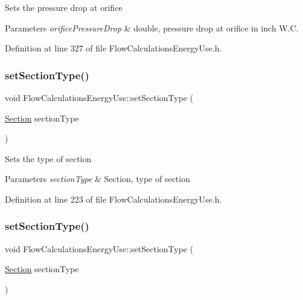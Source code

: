 Sets the pressure drop at orifice


\begin{DoxyParams}{Parameters}
{\em orifice\+Pressure\+Drop} & double, pressure drop at orifice in inch W.\+C. \\
\hline
\end{DoxyParams}


Definition at line 327 of file Flow\+Calculations\+Energy\+Use.\+h.

\mbox{\label{class_flow_calculations_energy_use_add93257048914dbd920b6dc2be431b69}} 
\subsubsection{\texorpdfstring{set\+Section\+Type()}{setSectionType()}\hspace{0.1cm}{\footnotesize\ttfamily [1/3]}}
{\footnotesize\ttfamily void Flow\+Calculations\+Energy\+Use\+::set\+Section\+Type (\begin{DoxyParamCaption}\item[{\hyperlink{class_flow_calculations_energy_use_afbabab0da698748de91369a5dfc7662a}{Section}}]{section\+Type }\end{DoxyParamCaption})\hspace{0.3cm}{\ttfamily [inline]}}

Sets the type of section


\begin{DoxyParams}{Parameters}
{\em section\+Type} & Section, type of section \\
\hline
\end{DoxyParams}


Definition at line 223 of file Flow\+Calculations\+Energy\+Use.\+h.

\mbox{\label{class_flow_calculations_energy_use_add93257048914dbd920b6dc2be431b69}} 
\subsubsection{\texorpdfstring{set\+Section\+Type()}{setSectionType()}\hspace{0.1cm}{\footnotesize\ttfamily [2/3]}}
{\footnotesize\ttfamily void Flow\+Calculations\+Energy\+Use\+::set\+Section\+Type (\begin{DoxyParamCaption}\item[{\hyperlink{class_flow_calculations_energy_use_afbabab0da698748de91369a5dfc7662a}{Section}}]{section\+Type }\end{DoxyParamCaption})\hspace{0.3cm}{\ttfamily [inline]}}

